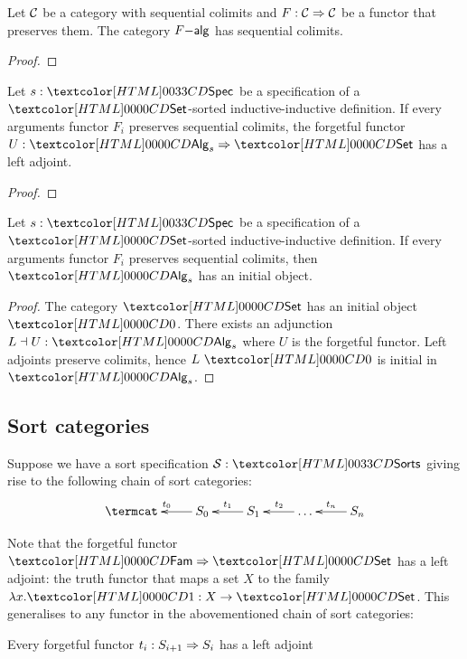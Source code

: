 \begin{proposition}
  Let $\mathcal{C}$ be a category with sequential colimits and
  $F : \mathcal{C} \Rightarrow \mathcal{C}$ be a functor that preserves them. The category
  $F\mathsf{-alg}$ has sequential colimits.
\end{proposition}

\begin{proof}
  
\end{proof}

\begin{proposition}
  Let $s : \specty$ be a specification of a $\Set$-sorted
  inductive-inductive definition. If every arguments functor $F_i$
  preserves sequential colimits, the forgetful functor
  $U : \Func{\Alg_s}{\Set}$ has a left adjoint.
\end{proposition}

\begin{proof}
  
\end{proof}

\begin{proposition}
  Let $s : \specty$ be a specification of a
  $\Set$-sorted inductive-inductive definition. If every arguments
  functor $F_i$ preserves sequential colimits, then
  $\Alg_s$ has an initial object.
\end{proposition}

\begin{proof}
  The category $\Set$ has an initial object $\initty$. There exists an
  adjunction $L \dashv U : \Alg_s$ where $U$ is the
  forgetful functor. Left adjoints preserve colimits, hence
  $L\ \initty$ is initial in $\Alg_s$.
\end{proof}

\subsection{Sort categories}

Suppose we have a sort specification $\Ss : \sortsty$ giving rise to
the following chain of sort categories:
$$
\xymatrix{
\termcat &S_0 \ar[l]_{t_0} &S_1 \ar[l]_{t_1} &\hdots \ar[l]_{t_2} &S_n \ar[l]_{t_n}
}
$$

Note that the forgetful functor $\Func{\Fam}{\Set}$ has a left
adjoint: the truth functor that maps a set $X$ to the family
$\lambda x . \unitty : X \to \Set$. This generalises to any functor in
the abovementioned chain of sort categories:

\begin{proposition}
Every forgetful functor $t_i : S_{i+1} \Rightarrow S_i$ has a left adjoint
\end{proposition}

